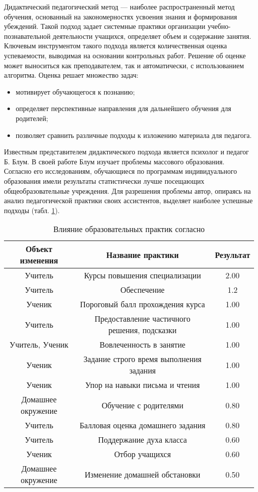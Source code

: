 Дидактический педагогический метод --- наиболее распространенный метод обучения, основанный на закономерностях 
усвоения знания и формирования убеждений. Такой подход задает системные практики организации учебно-познавательной деятельности учащихся,
определяет объем и содержание занятия. Ключевым инструментом такого подхода является 
количественная оценка успеваемости, выводимая на основании контрольных работ. Решение об оценке может выноситься как преподавателем,
так и автоматически, с использованием алгоритма. Оценка решает множество задач: 
 \begin{itemize}
    \item мотивирует обучающегося к познанию;
    \item определяет перспективные направления для дальнейшего обучения для родителей;
    \item позволяет сравнить различные подходы к изложению материала для педагога.
\end{itemize}

Известным представителем дидактического подхода является психолог и педагог Б. Блум.
В своей работе \cite{bloom1984} Блум изучает проблемы массового образования.
Согласно его исследованиям, обучающиеся по программам индивидуального образования имели результаты статистически лучше
посещающих общеобразовательные учреждения. Для разрешения проблемы автор, опираясь на анализ педагогической практики
своих ассистентов, выделяет наиболее успешные подходы (табл. \ref{bloom_table}).

\begin{table}
    \centering
    \begin{tabular}{||c |c| c ||}
        \hline
        Объект изменения &	Название практики &  Результат\\
        \hline
        Учитель & Курсы повышения специализации &	2.00 \\	
        Учитель	& Обеспечение	& 1.2	\\	 
        Ученик	& Пороговый балл прохождения курса & 1.00	\\	
        Учитель	& Предоставление частичного решения, подсказки	& 1.00	\\	
        Учитель, Ученик	& Вовлеченность в занятие & 1.00	\\	
        Ученик	& Задание строго время выполнения задания &	1.00	\\
        Ученик & Упор на навыки письма и чтения & 	1.00	\\
        Домашнее окружение & Обучение с родителями &	0.80 \\	
        Учитель	& Балловая оценка домашнего задания	&0.80	\\
        Учитель	& Поддержание духа класса &	0.60	\\
        Ученик	& Отбор учащихся &0.60	\\
        Домашнее окружение & Изменение домашней обстановки & 0.50 \\
        \hline	
    \end{tabular}
    \caption{Влияние образовательных практик согласно \cite{bloom1984}}
    \label{bloom_table}
\end{table}


